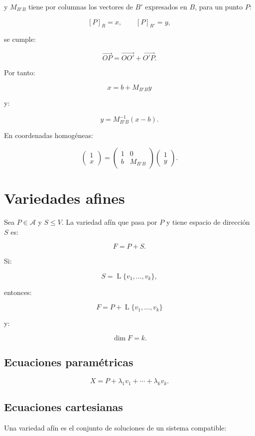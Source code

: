 \documentclass[11pt,a4paper]{article}
\newcommand{\Span}{\operatorname{L}}
\begin{document}
y $M_{B'B}$ tiene por columnas los vectores de $B'$ expresados en $B$, para un punto $P$:

\[
[P]_R=x,
\qquad
[P]_{R'}=y,
\]

se cumple:

\[
\overrightarrow{OP}
=
\overrightarrow{OO'}
+
\overrightarrow{O'P}.
\]

Por tanto:

\[
\boxed{
x=b+M_{B'B}y
}
\]

y:

\[
\boxed{
y=M_{B'B}^{-1}(x-b).
}
\]

En coordenadas homogéneas:

\[
\boxed{
\begin{pmatrix}1\\x\end{pmatrix}
=
\begin{pmatrix}
1&0\\
b&M_{B'B}
\end{pmatrix}
\begin{pmatrix}1\\y\end{pmatrix}.
}
\]

\section{Variedades afines}

Sea $P\in\mathcal A$ y $S\leq V$. La variedad afín que pasa por $P$ y tiene espacio de dirección $S$ es:

\[
\boxed{
F=P+S.
}
\]

Si:

\[
S=\Span\{v_1,\ldots,v_k\},
\]

entonces:

\[
\boxed{
F=
P+\Span\{v_1,\ldots,v_k\}
}
\]

y:

\[
\boxed{\dim F=k.}
\]

\subsection{Ecuaciones paramétricas}

\[
\boxed{
X=P+\lambda_1v_1+\cdots+\lambda_kv_k.
}
\]

\subsection{Ecuaciones cartesianas}

Una variedad afín es el conjunto de soluciones de un sistema compatible:
\end{document}
